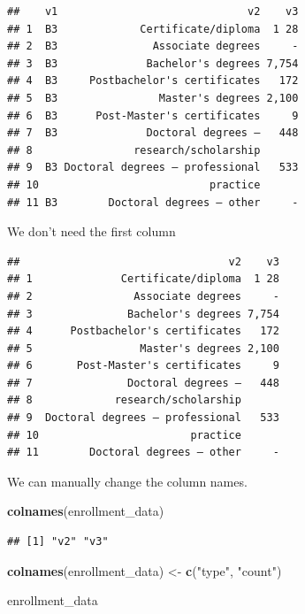 \documentclass[
]{book}
\newenvironment{Shaded}{\begin{snugshade}}{\end{snugshade}}
\newcommand{\KeywordTok}[1]{\textcolor[rgb]{0.13,0.29,0.53}{\textbf{#1}}}
\newcommand{\NormalTok}[1]{#1}
\newcommand{\OperatorTok}[1]{\textcolor[rgb]{0.81,0.36,0.00}{\textbf{#1}}}
\newcommand{\StringTok}[1]{\textcolor[rgb]{0.31,0.60,0.02}{#1}}
\begin{document}
\begin{verbatim}
##    v1                              v2    v3
## 1  B3             Certificate/diploma  1 28
## 2  B3               Associate degrees     -
## 3  B3              Bachelor's degrees 7,754
## 4  B3     Postbachelor's certificates   172
## 5  B3                Master's degrees 2,100
## 6  B3      Post-Master's certificates     9
## 7  B3              Doctoral degrees –   448
## 8                research/scholarship      
## 9  B3 Doctoral degrees – professional   533
## 10                           practice      
## 11 B3        Doctoral degrees – other     -
\end{verbatim}

We don't need the first column

\begin{Shaded}
\end{Shaded}

\begin{verbatim}
##                                 v2    v3
## 1              Certificate/diploma  1 28
## 2                Associate degrees     -
## 3               Bachelor's degrees 7,754
## 4      Postbachelor's certificates   172
## 5                 Master's degrees 2,100
## 6       Post-Master's certificates     9
## 7               Doctoral degrees –   448
## 8             research/scholarship      
## 9  Doctoral degrees – professional   533
## 10                        practice      
## 11        Doctoral degrees – other     -
\end{verbatim}

We can manually change the column names.

\begin{Shaded}
\begin{Highlighting}[]
\KeywordTok{colnames}\NormalTok{(enrollment_data) }
\end{Highlighting}
\end{Shaded}

\begin{verbatim}
## [1] "v2" "v3"
\end{verbatim}

\begin{Shaded}
\begin{Highlighting}[]
\KeywordTok{colnames}\NormalTok{(enrollment_data) <-}\StringTok{ }\KeywordTok{c}\NormalTok{(}\StringTok{"type"}\NormalTok{, }
                               \StringTok{"count"}\NormalTok{)}

\NormalTok{enrollment_data}
\end{Highlighting}
\end{Shaded}
\end{document}
